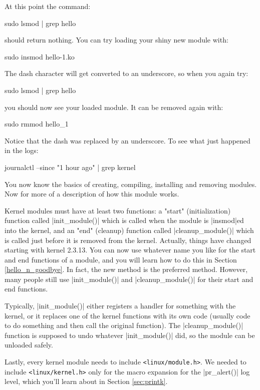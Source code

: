 \documentclass[10pt, oneside]{book}
\begin{document}
At this point the command:
\begin{codebash}
sudo lsmod | grep hello
\end{codebash}

should return nothing.
You can try loading your shiny new module with:
\begin{codebash}
sudo insmod hello-1.ko
\end{codebash}

The dash character will get converted to an underscore, so when you again try:
\begin{codebash}
sudo lsmod | grep hello
\end{codebash}

you should now see your loaded module. It can be removed again with:
\begin{codebash}
sudo rmmod hello_1
\end{codebash}

Notice that the dash was replaced by an underscore.
To see what just happened in the logs:
\begin{codebash}
journalctl --since "1 hour ago" | grep kernel
\end{codebash}

You now know the basics of creating, compiling, installing and removing modules.
Now for more of a description of how this module works.

Kernel modules must have at least two functions: a "start" (initialization) function called \cpp|init_module()| which is called when the module is \sh|insmod|ed into the kernel, and an "end" (cleanup) function called \cpp|cleanup_module()| which is called just before it is removed from the kernel.
Actually, things have changed starting with kernel 2.3.13.
You can now use whatever name you like for the start and end functions of a module, and you will learn how to do this in Section \ref{hello_n_goodbye}.
In fact, the new method is the preferred method.
However, many people still use \cpp|init_module()| and \cpp|cleanup_module()| for their start and end functions.

Typically, \cpp|init_module()| either registers a handler for something with the kernel, or it replaces one of the kernel functions with its own code (usually code to do something and then call the original function).
The \cpp|cleanup_module()| function is supposed to undo whatever \cpp|init_module()| did, so the module can be unloaded safely.

Lastly, every kernel module needs to include \verb|<linux/module.h>|.
We needed to include \verb|<linux/kernel.h>| only for the macro expansion for the \cpp|pr_alert()| log level, which you'll learn about in Section \ref{sec:printk}.
\end{document}
